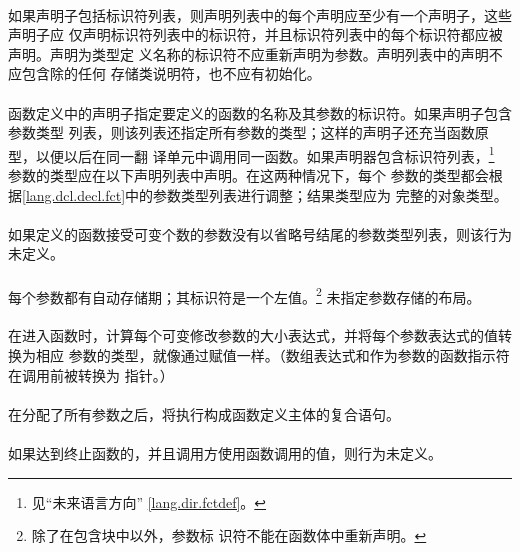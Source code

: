 {\paragraph{}
如果声明子包括标识符列表，则声明列表中的每个声明应至少有一个声明子，这些声明子应
仅声明标识符列表中的标识符，并且标识符列表中的每个标识符都应被声明。声明为类型定
义名称的标识符不应重新声明为参数。声明列表中的声明不应包含除的任何
存储类说明符，也不应有初始化。

\semantic
\paragraph{}
函数定义中的声明子指定要定义的函数的名称及其参数的标识符。如果声明子包含参数类型
列表，则该列表还指定所有参数的类型；这样的声明子还充当函数原型，以便以后在同一翻
译单元中调用同一函数。如果声明器包含标识符列表，\footnote{见``未来语言方向''
\ref{lang.dir.fctdef}。} 参数的类型应在以下声明列表中声明。在这两种情况下，每个
参数的类型都会根据\ref{lang.dcl.decl.fct}中的参数类型列表进行调整；结果类型应为
完整的对象类型。

\paragraph{}
如果定义的函数接受可变个数的参数没有以省略号结尾的参数类型列表，则该行为未定义。

\paragraph{}
每个参数都有自动存储期；其标识符是一个左值。\footnote{除了在包含块中以外，参数标
识符不能在函数体中重新声明。} 未指定参数存储的布局。

\paragraph{}
在进入函数时，计算每个可变修改参数的大小表达式，并将每个参数表达式的值转换为相应
参数的类型，就像通过赋值一样。（数组表达式和作为参数的函数指示符在调用前被转换为
指针。）

\paragraph{}
在分配了所有参数之后，将执行构成函数定义主体的复合语句。

\paragraph{}
如果达到终止函数的\tm{\}}，并且调用方使用函数调用的值，则行为未定义。

}
